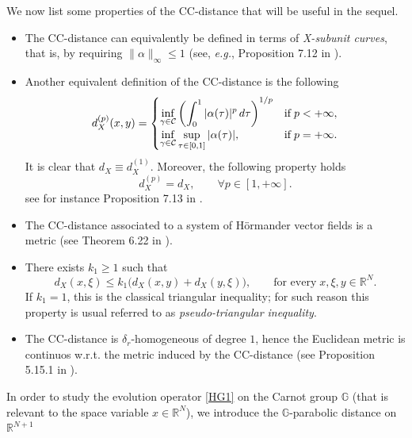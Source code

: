 \documentclass[11pt,a4paper]{article}
\numberwithin{equation}{section}
\def \rn {{\mathbb {R}}^{N}}
\def \rnn {{\mathbb {R}}^{N+1}}
\def \GG {{\mathbb{G}}}
\def \a {{\alpha}}
\def \d {{\delta}}
\def \t {{\tau}}
\def \x {{\xi}}
\begin{document}
We now list some properties of the CC-distance that will be useful in the sequel. 
\begin{itemize}
	\item The CC-distance can equivalently be defined in terms of \emph{X-subunit curves}, that is, by requiring $\|\a\|_{\infty}\leq 1$ (see, \emph{e.g.}, Proposition 7.12 in \cite{biagi2019introduction}).
	\item Another equivalent definition of the CC-distance is the following
	\begin{equation}\label{p=2}
		d^{(p)}_X(x,y) = \begin{cases}
			\displaystyle\inf_{\gamma \in \mathcal{C}}\left(\int_0^1 |\a(\t)|^p\, d\t \right)^{1/p}		
			& 
			\text{if} \hspace{1mm} p < +\infty, \\
			\displaystyle\inf_{\gamma \in \mathcal{C}}\sup_{\t\in[0,1]}|\a(\t)|, & \text{if} \hspace{1mm} p = + \infty.
		\end{cases}
	\end{equation}
	It is clear that $d_X \equiv d_X^{(1)}$. Moreover, the following property holds
	\begin{equation}\label{eq:d1-dp}
		d^{(p)}_X=d_X, \qquad \forall p \in [1,+\infty].
	\end{equation}
	see for instance Proposition 7.13 in \cite{biagi2019introduction}.
	\item The CC-distance associated to a system of H\"{o}rmander vector fields is a metric (see Theorem 6.22 in \cite{biagi2019introduction}). 
	
	\item There exists $k_1\geq 1$ such that 
	\begin{equation}\label{k1}
		d_X(x,\x)\leq k_1\big(d_X(x,y) + d_X(y,\x)\big),\qquad \text{for every} \;x,\x,y \in \rn.
	\end{equation}  
	If $k_1=1$, this is the classical triangular inequality; for such reason this property is usual referred to as \emph{pseudo-triangular inequality}.
	\item The CC-distance is $\d_r$-homogeneous of degree $1$, hence the Euclidean metric is continuos w.r.t. the metric induced by the CC-distance (see Proposition 5.15.1 in \cite{bonfiglioli2004fundamental}).	
\end{itemize}
In order to study the evolution operator \eqref{HG1} on the Carnot group $\GG$ (that is relevant to the space variable $x\in\rn$), we introduce the  $\GG$-parabolic distance on $\rnn$ 
\end{document}
